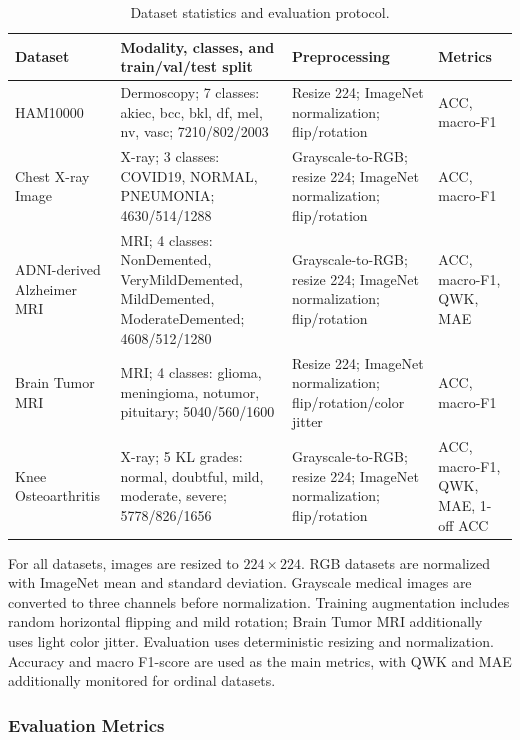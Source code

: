 \documentclass[runningheads]{llncs}
\begin{document}
\begin{table}[H]
    \centering
    \caption{Dataset statistics and evaluation protocol.}
    \label{tab:dataset_statistics}
    \scriptsize
    \setlength{\tabcolsep}{3pt}
    \begin{tabular}{p{}p{}p{}p{}}
        \toprule
        Dataset & Modality, classes, and train/val/test split & Preprocessing & Metrics \\
        \midrule
        HAM10000 & Dermoscopy; 7 classes: akiec, bcc, bkl, df, mel, nv, vasc; 7210/802/2003 & Resize 224; ImageNet normalization; flip/rotation & ACC, macro-F1 \\
        Chest X-ray Image & X-ray; 3 classes: COVID19, NORMAL, PNEUMONIA; 4630/514/1288 & Grayscale-to-RGB; resize 224; ImageNet normalization; flip/rotation & ACC, macro-F1 \\
        ADNI-derived Alzheimer MRI & MRI; 4 classes: NonDemented, VeryMildDemented, MildDemented, ModerateDemented; 4608/512/1280 & Grayscale-to-RGB; resize 224; ImageNet normalization; flip/rotation & ACC, macro-F1, QWK, MAE \\
        Brain Tumor MRI & MRI; 4 classes: glioma, meningioma, notumor, pituitary; 5040/560/1600 & Resize 224; ImageNet normalization; flip/rotation/color jitter & ACC, macro-F1 \\
        Knee Osteoarthritis & X-ray; 5 KL grades: normal, doubtful, mild, moderate, severe; 5778/826/1656 & Grayscale-to-RGB; resize 224; ImageNet normalization; flip/rotation & ACC, macro-F1, QWK, MAE, 1-off ACC \\
        \bottomrule
    \end{tabular}
\end{table}

For all datasets, images are resized to \(224 \times 224\). RGB datasets are normalized with ImageNet mean and standard deviation. Grayscale medical images are converted to three channels before normalization. Training augmentation includes random horizontal flipping and mild rotation; Brain Tumor MRI additionally uses light color jitter. Evaluation uses deterministic resizing and normalization. Accuracy and macro F1-score are used as the main metrics, with QWK and MAE additionally monitored for ordinal datasets.


\subsubsection{Evaluation Metrics}
\end{document}
